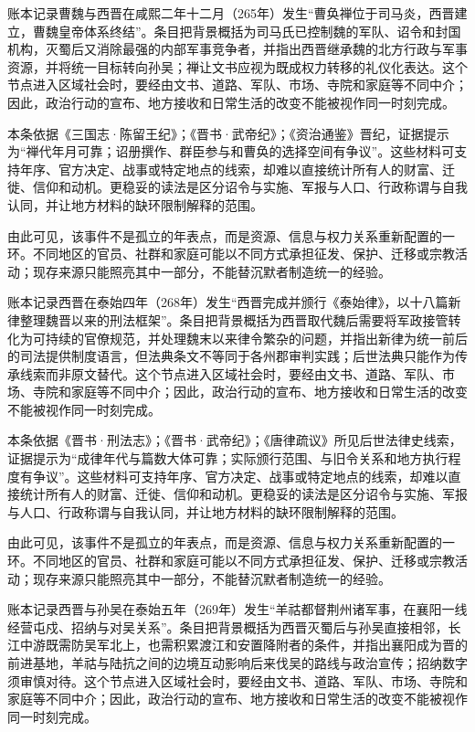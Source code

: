 账本记录曹魏与西晋在咸熙二年十二月（265年）发生“曹奂禅位于司马炎，西晋建立，曹魏皇帝体系终结”。条目把背景概括为司马氏已控制魏的军队、诏令和封国机构，灭蜀后又消除最强的内部军事竞争者，并指出西晋继承魏的北方行政与军事资源，并将统一目标转向孙吴；禅让文书应视为既成权力转移的礼仪化表达。这个节点进入区域社会时，要经由文书、道路、军队、市场、寺院和家庭等不同中介；因此，政治行动的宣布、地方接收和日常生活的改变不能被视作同一时刻完成。

本条依据《三国志·陈留王纪》；《晋书·武帝纪》；《资治通鉴》晋纪，证据提示为“禅代年月可靠；诏册撰作、群臣参与和曹奂的选择空间有争议”。这些材料可支持年序、官方决定、战事或特定地点的线索，却难以直接统计所有人的财富、迁徙、信仰和动机。更稳妥的读法是区分诏令与实施、军报与人口、行政称谓与自我认同，并让地方材料的缺环限制解释的范围。

由此可见，该事件不是孤立的年表点，而是资源、信息与权力关系重新配置的一环。不同地区的官员、社群和家庭可能以不同方式承担征发、保护、迁移或宗教活动；现存来源只能照亮其中一部分，不能替沉默者制造统一的经验。

账本记录西晋在泰始四年（268年）发生“西晋完成并颁行《泰始律》，以十八篇新律整理魏晋以来的刑法框架”。条目把背景概括为西晋取代魏后需要将军政接管转化为可持续的官僚规范，并处理魏末以来律令繁杂的问题，并指出新律为统一前后的司法提供制度语言，但法典条文不等同于各州郡审判实践；后世法典只能作为传承线索而非原文替代。这个节点进入区域社会时，要经由文书、道路、军队、市场、寺院和家庭等不同中介；因此，政治行动的宣布、地方接收和日常生活的改变不能被视作同一时刻完成。

本条依据《晋书·刑法志》；《晋书·武帝纪》；《唐律疏议》所见后世法律史线索，证据提示为“成律年代与篇数大体可靠；实际颁行范围、与旧令关系和地方执行程度有争议”。这些材料可支持年序、官方决定、战事或特定地点的线索，却难以直接统计所有人的财富、迁徙、信仰和动机。更稳妥的读法是区分诏令与实施、军报与人口、行政称谓与自我认同，并让地方材料的缺环限制解释的范围。

由此可见，该事件不是孤立的年表点，而是资源、信息与权力关系重新配置的一环。不同地区的官员、社群和家庭可能以不同方式承担征发、保护、迁移或宗教活动；现存来源只能照亮其中一部分，不能替沉默者制造统一的经验。

账本记录西晋与孙吴在泰始五年（269年）发生“羊祜都督荆州诸军事，在襄阳一线经营屯戍、招纳与对吴关系”。条目把背景概括为西晋灭蜀后与孙吴直接相邻，长江中游既需防吴军北上，也需积累渡江和安置降附者的条件，并指出襄阳成为晋的前进基地，羊祜与陆抗之间的边境互动影响后来伐吴的路线与政治宣传；招纳数字须审慎对待。这个节点进入区域社会时，要经由文书、道路、军队、市场、寺院和家庭等不同中介；因此，政治行动的宣布、地方接收和日常生活的改变不能被视作同一时刻完成。

